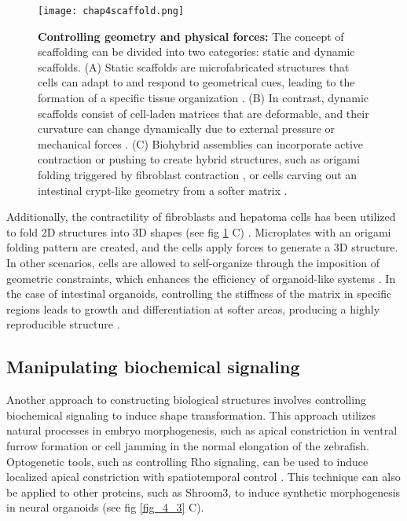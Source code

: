 \begin{figure}
\centering
\texttt{[image: chap4scaffold.png]}
\caption{\label{fig_4_2}\textbf{Controlling geometry and physical forces: } The concept of scaffolding can be divided into two categories: static and dynamic scaffolds. (A) Static scaffolds are microfabricated structures that cells can adapt to and respond to geometrical cues, leading to the formation of a specific tissue organization \cite{brassard2021}. (B) In contrast, dynamic scaffolds consist of cell-laden matrices that are deformable, and their curvature can change dynamically due to external pressure or mechanical forces \cite{blonski2021, chan2018}. (C) Biohybrid assemblies can incorporate active contraction or pushing to create hybrid structures, such as origami folding triggered by fibroblast contraction \cite{he2018}, or cells carving out an intestinal crypt-like geometry from a softer matrix \cite{gjorevski2016}.}
\end{figure}

Additionally, the contractility of fibroblasts and hepatoma cells has been utilized to fold 2D structures into 3D shapes \cite{he2018} (see fig \ref{fig_4_2} C) . Microplates with an origami folding pattern are created, and the cells apply forces to generate a 3D structure. In other scenarios, cells are allowed to self-organize through the imposition of geometric constraints, which enhances the efficiency of organoid-like systems \cite{gjorevski2016}. In the case of intestinal organoids, controlling the stiffness of the matrix in specific regions leads to growth and differentiation at softer areas, producing a highly reproducible structure \cite{gjorevski2022}.

\hypertarget{manipulating-biochemical-signaling}{%
	\subsection{Manipulating biochemical signaling}\label{manipulating-biochemical-signaling}}

Another approach to constructing biological structures involves controlling biochemical signaling to induce shape transformation. This approach utilizes natural processes in embryo morphogenesis, such as apical constriction in ventral furrow formation or cell jamming in the normal elongation of the zebrafish. Optogenetic tools, such as controlling Rho signaling, can be used to induce localized apical constriction with spatiotemporal control \cite{izquierdo2018}. This technique can also be applied to other proteins, such as Shroom3, to induce synthetic morphogenesis in neural organoids \cite{martinez-ara2022} (see fig \ref{fig_4_3} C).

